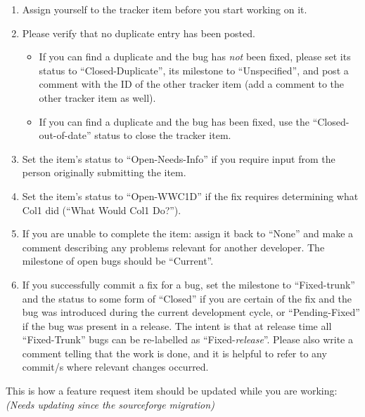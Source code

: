 \documentclass[12pt]{book}
\begin{document}
\begin{enumerate}
\item Assign yourself to the tracker item before you start working on it.

\item Please verify that no duplicate entry has been posted.

\begin{itemize}
\item If you can find a duplicate and the bug has \emph{not} been
  fixed, please set its status to ``Closed-Duplicate'', its milestone
  to ``Unspecified'', and post a comment with the ID of the other
  tracker item (add a comment to the other tracker item as well).

\item If you can find a duplicate and the bug has been fixed, use the
  ``Closed-out-of-date'' status to close the tracker item.
\end{itemize}

\item Set the item's status to ``Open-Needs-Info'' if you require
  input from the person originally submitting the item.

\item Set the item's status to ``Open-WWC1D'' if the fix requires
  determining what Col1 did (``What Would Col1 Do?'').

\item If you are unable to complete the item: assign it back to
  ``None'' and make a comment describing any problems relevant for
  another developer. The milestone of open bugs should be ``Current''.

\item If you successfully commit a fix for a bug, set the milestone to
  ``Fixed-trunk'' and the status to some form of ``Closed'' if you are
  certain of the fix and the bug was introduced during the current
  development cycle, or ``Pending-Fixed'' if the bug was present in a
  release.  The intent is that at release time all ``Fixed-Trunk''
  bugs can be re-labelled as ``Fixed-\emph{release}''.  Please also
  write a comment telling that the work is done, and it is helpful to
  refer to any commit/s where relevant changes occurred.
\end{enumerate}


This is how a feature request item should be updated while you are
working:\emph{(Needs updating since the sourceforge migration)}
\end{document}

